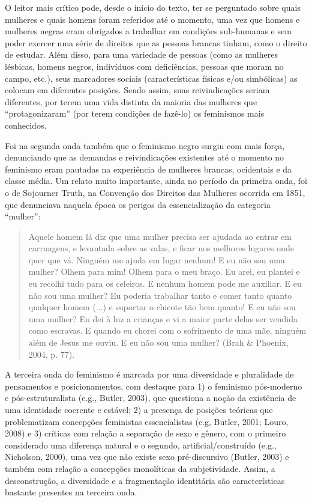 O leitor mais crítico pode, desde o início do texto, ter se perguntado sobre quais mulheres e quais homens foram referidos até o momento, uma vez que homens e mulheres negras eram obrigados a trabalhar em condições sub-humanas e sem poder exercer uma série de direitos que as pessoas brancas tinham, como o direito de estudar. Além disso, para uma variedade de pessoas (como as mulheres lésbicas, homens negros, indivíduos com deficiências, pessoas que moram no campo, etc.), seus marcadores sociais (características físicas e/ou simbólicas) as colocam em diferentes posições. Sendo assim, suas reivindicações seriam diferentes, por terem uma vida distinta da maioria das mulheres que ``protagonizaram'' (por terem condições de fazê-lo) os feminismos mais conhecidos. 

Foi na segunda onda também que o feminismo negro surgiu com mais força, denunciando que as demandas e reivindicações existentes até o momento no feminismo eram pautadas na experiência de mulheres brancas, ocidentais e da classe média. Um relato muito importante, ainda no período da primeira onda, foi o de Sojourner Truth, na Convenção dos Direitos das Mulheres ocorrida em 1851, que denunciava naquela época os perigos da essencialização da categoria ``mulher'': 

\begin{quote}
    Aquele homem lá diz que uma mulher precisa ser ajudada ao entrar em carruagens, e levantada sobre as valas, e ficar nos melhores lugares onde quer que vá. Ninguém me ajuda em lugar nenhum! E eu não sou uma mulher? Olhem para mim! Olhem para o meu braço. Eu arei, eu plantei e eu recolhi tudo para os celeiros. E nenhum homem pode me auxiliar. E eu não sou uma mulher? Eu poderia trabalhar tanto e comer tanto quanto qualquer homem (...) e suportar o chicote tão bem quanto! E eu não sou uma mulher? Eu dei à luz a crianças e vi a maior parte delas ser vendida como escravas. E quando eu chorei com o sofrimento de uma mãe, ninguém além de Jesus me ouviu. E eu não sou uma mulher? (Brah \& Phoenix, 2004, p. 77).
\end{quote}

A terceira onda do feminismo é marcada por uma diversidade e pluralidade de pensamentos e posicionamentos, com destaque para 1) o feminismo pós-moderno e pós-estruturalista (e.g., Butler, 2003), que questiona a noção da existência de uma identidade coerente e estável; 2) a presença de posições teóricas que problematizam concepções feministas essencialistas (e.g, Butler, 2001; Louro, 2008) e 3) críticas com relação a separação de sexo e gênero, com o primeiro considerado uma diferença natural e o segundo, artificial/construído (e.g., Nicholson, 2000), uma vez que não existe sexo pré-discursivo (Butler, 2003) e também com relação a concepções monolíticas da subjetividade. Assim, a desconstrução, a diversidade e a fragmentação identitária são características bastante presentes na terceira onda.


